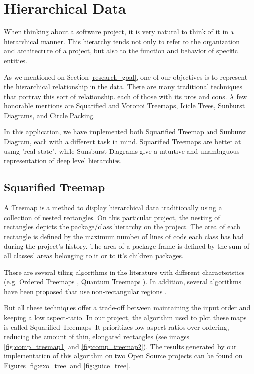 \section{Hierarchical Data} \label{sec:hierarchy}
When thinking about a software project, it is very natural to think of it in a hierarchical manner. This hierarchy tends not only to refer to the organization and architecture of a project, but also to the function and behavior of specific entities.

As we mentioned on Section \ref{research_goal}, one of our objectives is to represent the hierarchical relationship in the data. There are many traditional techniques that portray this sort of relationship, each of those with its pros and cons. A few honorable mentions are Squarified \cite{ref:squarified} and Voronoi \cite{ref:tree2} Treemaps, Icicle Trees, Sunburst Diagrams, and Circle Packing.

In this application, we have implemented both Squarified Treemap and Sunburst Diagram, each with a different task in mind. Squarified Treemaps are better at using "real state", while Sunsburst Diagrams give a intuitive and unambiguous representation of deep level hierarchies.

\subsection{Squarified Treemap}
A Treemap is a method to display hierarchical data traditionally using a collection of nested rectangles. On this particular project, the nesting of rectangles depicts the package/class hierarchy on the project. The area of each rectangle is defined by the maximum number of lines of code each class has had during the project's history. The area of a package frame is defined by the sum of all classes' areas belonging to it or to it's children packages.

There are several tiling algorithms in the literature with different characteristics (e.g. Ordered Treemaps \cite{ref:orderedtreemap}, Quantum Treemaps \cite{ref:quantumtreemap}). In addition, several algorithms have been proposed that use non-rectangular regions  \cite{ref:tree1,ref:tree2,ref:tree3}.

But all these techniques offer a trade-off between maintaining the input order and keeping a low aspect-ratio. In our project, the algorithm used to plot these maps is called Squarified Treemaps\cite{ref:squarified}. It prioritizes low aspect-ratios over ordering, reducing the amount of thin, elongated rectangles (see images \ref{fig:comp_treemap1} and \ref{fig:comp_treemap2}). The results generated by our implementation of this algorithm on two Open Source projects can be found on Figures \ref{fig:exo_tree} and \ref{fig:guice_tree}.

